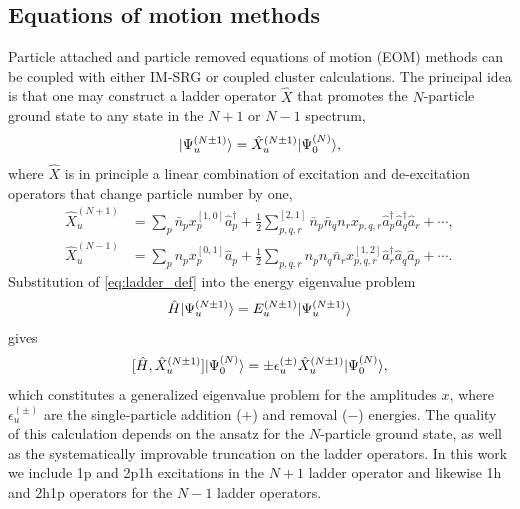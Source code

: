 \subsection{Equations of motion methods}

Particle attached and particle removed equations of motion (EOM) methods can be coupled with either IM-SRG or coupled cluster calculations. The principal idea is that one may construct a ladder operator $\hat{X}$ that promotes the $N$-particle ground state to any state in the $N + 1$ or $N - 1$ spectrum,
\begin{equation}\label{eq:ladder_def}
  | \Psi^{(N \pm 1)}_u \rangle  = \hat{X}^{(N \pm 1)}_u | \Psi^{(N)}_0 \rangle,
\end{equation}
where $\hat{X}$ is in principle a linear combination of excitation and de-excitation operators that change particle number by one,
\begin{align}
  \label{eq:gen_attached}
  \hat{X}^{(N+1)}_u &= \sum_p \bar{n}_p x^{[1,0]}_p  \hat{a}^\dagger_p + \frac{1}{2} \sum^{[2,1]}_{p, q, r} \bar{n}_p \bar{n}_q n_r x_{p, q, r} \hat{a}^\dagger_p \hat{a}^\dagger_q \hat{a}_r + \cdots,  \\
  \label{eq:gen_removed}
  \hat{X}^{(N-1)}_u &= \sum_p n_p x_p^{[0,1]} \hat{a}_p + \frac{1}{2} \sum_{p, q, r} n_p n_q \bar{n}_r  x^{[1,2]}_{p, q, r} \hat{a}^\dagger_r \hat{a}_q \hat{a}_p  + \cdots.
\end{align}
Substitution of \eqref{eq:ladder_def} into the energy eigenvalue problem
\begin{gather*}
  \hat H | \Psi_u^{(N \pm 1)} \rangle = E^{(N\pm1)}_u | \Psi_u^{(N \pm 1)} \rangle
\end{gather*}
gives
\begin{equation}\label{eq:EOM}
  [\hat{H}, \hat{X}^{(N \pm 1)}_u] | \Psi^{(N)}_0 \rangle = \pm \epsilon^{(\pm)}_u \hat{X}^{(N \pm 1)}_u | \Psi^{(N)}_0 \rangle,
\end{equation}
which constitutes a generalized eigenvalue problem for the amplitudes $x$, where $\epsilon^{(\pm)}_u$ are the single-particle addition ($+$) and removal ($-$) energies. The quality of this calculation depends on the ansatz for the $N$-particle ground state, as well as the systematically improvable truncation on the ladder operators. In this work we include 1p and 2p1h excitations in the $N + 1$ ladder operator and likewise 1h and 2h1p operators for the $N - 1$ ladder operators.

